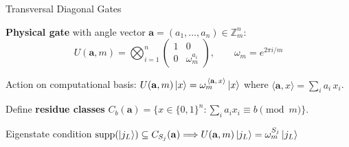 \documentclass[aspectratio=169,t,10pt]{beamer}
\newcommand{\ZZ}{\mathbb{Z}}
\newcommand{\Fintwo}{\{0,1\}}
\begin{document}
\begin{frame}{Transversal Diagonal Gates}

\textbf{Physical gate} with angle vector
$\mathbf{a}=(a_1,\ldots,a_n)\in\ZZ_m^n$:
\[
  U(\mathbf{a},m)
  = 
  \bigotimes_{i=1}^{n}\!
  \begin{pmatrix}1&0\\0&\omega_m^{a_i}\end{pmatrix},
  \qquad
  \omega_m = e^{2\pi i/m}
\]

Action on computational basis:
$ U(\mathbf{a},m)\ket{x}
  =  \omega_m^{\,\langle\mathbf{a},\,x\rangle}\ket{x}$
where
$\langle\mathbf{a},x\rangle
  = \sum_{i} a_i\, x_i$.

Define \textbf{residue classes}
$ C_b(\mathbf{a})
  = 
  \bigl\{x\in\Fintwo^n :
    \sum_i a_i x_i \equiv b \pmod{m}\bigr\}$.

\begin{alertblock}{Eigenstate condition}
$\mathrm{supp}(\ket{j_L})\subseteq C_{S_j}(\mathbf{a})
  \Longrightarrow  
U(\mathbf{a},m)\ket{j_L} = \omega_m^{S_j}\ket{j_L}$
\end{alertblock}
\end{frame}
\end{document}
